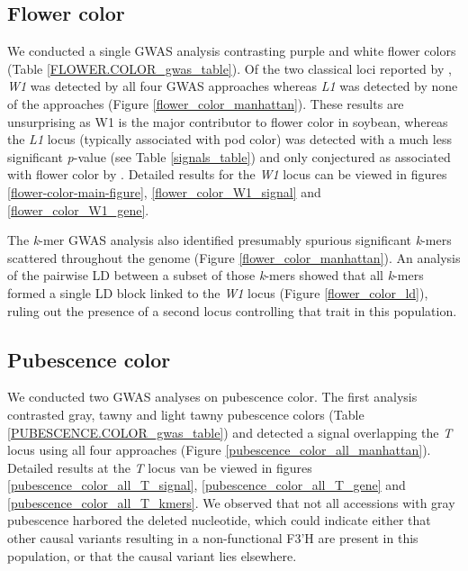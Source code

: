 \documentclass[12pt]{article}
\begin{document}
\subsection{Flower color}
\label{sv-gwas-flower-color}

We conducted a single GWAS analysis contrasting purple and white flower colors
(Table \ref{FLOWER.COLOR_gwas_table}). Of the two classical loci reported by
\cite{bandillo2017}, \textit{W1} was detected by all four GWAS approaches whereas
\textit{L1} was detected by none of the approaches (Figure
\ref{flower_color_manhattan}). These results are unsurprising as W1 is the
major contributor to flower color in soybean, whereas the \textit{L1} locus
(typically associated with pod color) was detected with a much less significant
\textit{p}-value (see Table \ref{signals_table}) and only conjectured as
associated with flower color by \cite{bandillo2017}. Detailed results for the
\textit{W1} locus can be viewed in figures \ref{flower-color-main-figure},
\ref{flower_color_W1_signal} and \ref{flower_color_W1_gene}.

The \textit{k}-mer GWAS analysis also identified presumably spurious significant
\textit{k}-mers scattered throughout the genome (Figure
\ref{flower_color_manhattan}). An analysis of the pairwise LD between a subset
of those \textit{k}-mers showed that all \textit{k}-mers formed a single LD block
linked to the \textit{W1} locus (Figure \ref{flower_color_ld}), ruling out the
presence of a second locus controlling that trait in this population.

\subsection{Pubescence color}
\label{sv-gwas-pubescence-color}

We conducted two GWAS analyses on pubescence color. The first analysis
contrasted gray, tawny and light tawny pubescence colors (Table
\ref{PUBESCENCE.COLOR_gwas_table}) and detected a signal overlapping the
\emph{T} locus using all four approaches (Figure
\ref{pubescence_color_all_manhattan}). Detailed results at the \textit{T} locus
van be viewed in figures \ref{pubescence_color_all_T_signal},
\ref{pubescence_color_all_T_gene} and \ref{pubescence_color_all_T_kmers}. We
observed that not all accessions with gray pubescence harbored the deleted
nucleotide, which could indicate either that other causal variants resulting in
a non-functional F3’H are present in this population, or that the causal
variant lies elsewhere.
\end{document}

